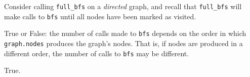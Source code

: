 \begin{prob}
    Consider calling \texttt{full_bfs} on a \textit{directed} graph, and recall
    that \texttt{full_bfs} will make calls to \texttt{bfs} until all nodes have been marked as visited.

    True or False: the number of calls made to \texttt{bfs} depends on the order in which \texttt{graph.nodes}
    produces the graph's nodes. That is, if nodes are produced in a different order, the number of calls to \texttt{bfs}
    may be different.

    \Tf{}

    \begin{soln}
        True.
    \end{soln}

\end{prob}
